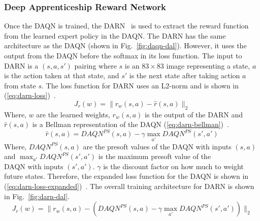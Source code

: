 \documentclass[12pt,american]{report}
\providecommand{\DIFaddbegin}{} %
\providecommand{\DIFaddend}{} %
\newcommand{\DIFaddincludegraphics}[2][]{{\color{blue}\fbox{\DIFOincludegraphics[#1]{#2}}}} %
\DeclareRobustCommand{\DIFaddbegin}{\DIFOaddbegin \let\includegraphics\DIFaddincludegraphics} %
\DeclareRobustCommand{\DIFaddend}{\DIFOaddend \let\includegraphics\DIFOincludegraphics} %
\begin{document}
\subsubsection{Deep Apprenticeship Reward Network}
Once the DAQN is trained, the DARN~\cite{markovikj2014deep} is used to extract the reward function from the learned expert policy in the DAQN.  The DARN has the same architecture as the DAQN (shown in Fig.~\ref{fig:daqn-dal}). However, it uses the output from the DAQN before the softmax in its loss function.  The input to DARN is a $(s,a,s')$ pairing where $s$ is an $83\times 83$ image representing a state, $a$ is the action taken at that state, and $s'$ is the next state after taking action $a$ from state $s$. The loss function for DARN uses an L2-norm and is shown in (\ref{eq:darn-loss})~\cite{markovikj2014deep}.
\begin{equation}
     \label{eq:darn-loss}
     J_r(w) =\|r_w(s,a) - \hat{r}(s,a) \|_2%
\end{equation}
Where, $w$ are the learned weights, $r_w(s,a)$ is the output of the DARN and $\hat{r}(s,a)$ is a Bellman representation of the DAQN (\ref{eq:darn-bellman})~\cite{markovikj2014deep}.
\begin{equation}
     \label{eq:darn-bellman}
     \hat{r}(s,a) = DAQN^{PS}(s,a) - \gamma \max_{a'}DAQN^{PS}(s',a')%
\end{equation}
Where, $DAQN^{PS}(s,a)$ are the presoft values of the DAQN with inputs $(s,a)$ and $\max_{a'}DAQN^{PS}(s',a')$ is the maximum presoft value of the \DIFaddbegin \\\DIFaddend DAQN with inputs $(s',a')$. $\gamma$ is the discount factor on how much to weight future states. Therefore, the expanded loss function for the DAQN is shown in (\ref{eq:darn-loss-expanded})~\cite{markovikj2014deep}.  The overall training architecture for DARN is shown in Fig.~\ref{fig:darn-dal}.
\begin{equation}
     \label{eq:darn-loss-expanded}
     J_r(w) =\|r_w(s,a) - (DAQN^{PS}(s,a) - \gamma \max_{a'}DAQN^{PS}(s',a'))\|_2%
\end{equation}
\end{document}
